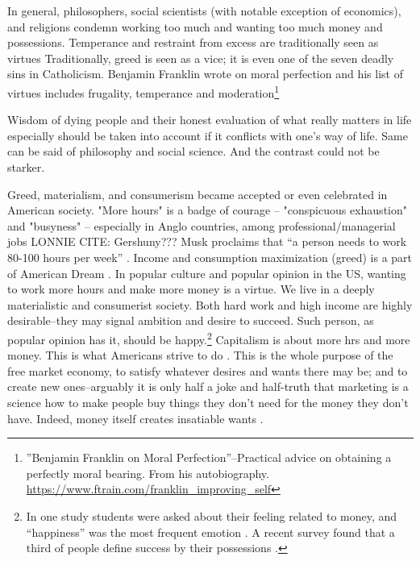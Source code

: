 \documentclass[10pt, letterpaper]{article}
\begin{document}
\begin{spacing}{1.8}
In general, philosophers, social scientists (with notable exception of
economics), and religions condemn working too much and wanting too much money and possessions. 
Temperance and restraint from excess are traditionally seen as virtues %
Traditionally, greed is seen as a vice; it is even one of the seven deadly sins in
Catholicism. Benjamin Franklin wrote on moral perfection and his list of virtues includes
frugality, temperance and moderation\footnote{''Benjamin Franklin on Moral Perfection''--Practical advice on obtaining a perfectly moral bearing. From his autobiography. \url{https://www.ftrain.com/franklin_improving_self}} 


Wisdom of dying people and their honest evaluation of what really matters in life especially
should be taken into account if it conflicts with one's way of life. Same can be
said of philosophy and social science. And the contrast could not be starker.


Greed, materialism, and consumerism became accepted or even celebrated in American
society.  "More hours" is a badge of courage -- "conspicuous exhaustion" and
"busyness" -- especially in Anglo countries, among professional/managerial jobs
LONNIE CITE: Gershuny??? 
%
Musk proclaims that ``a person needs to work 80-100 hours per week''  \citep{muskIN18nov26}.
 Income and consumption maximization (greed) is a part of American
Dream \citep{robinson2009greed}.
%
In popular culture and popular opinion in the US, wanting to work more hours and
make more money is a virtue. We live in a deeply materialistic and consumerist
society. Both hard work and high income are highly desirable--they may signal
ambition and desire to succeed. Such person, as popular opinion has it, should be
happy.\footnote{In one study students were asked about their feeling related
to money, and ``happiness'' was the most frequent emotion \citep{mogilner2010pursuit}.
A recent survey found that a third of people define success by their possessions
\citep[cited in][]{joye20}.}
%
Capitalism is about more hrs and more money. This is what Americans strive to do
\cite{aokditella}. This is the whole purpose of the free market economy, to satisfy whatever
desires and wants there may be; and to create new ones--arguably it is only half a joke
and half-truth that marketing is a science how to make people buy things they don't need for the money they don't have. 
Indeed, money itself creates insatiable wants \citep{marx1844-human-requirements}.



\end{spacing}
\end{document}
